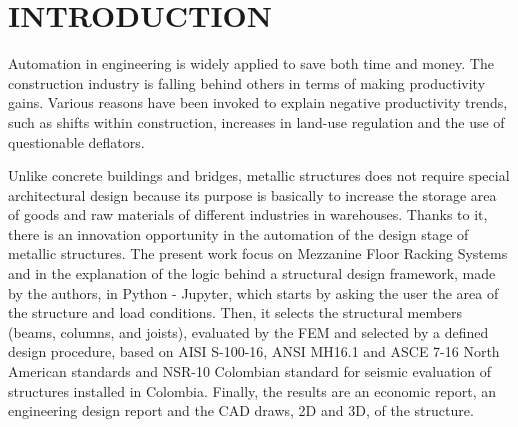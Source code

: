 \section*{INTRODUCTION}

Automation in engineering is widely applied to save both time and money. The construction industry is falling behind others in terms of making productivity gains\cite{Chen2018}. Various reasons have been invoked to explain negative productivity trends, such as shifts within construction, increases in land-use regulation and the use of questionable deflators\cite{ConsProd2016}. 

Unlike concrete buildings and bridges, metallic structures does not require special architectural design because its purpose is basically to increase the storage area of goods and raw materials of different industries in warehouses. Thanks to it, there is an innovation opportunity in the automation of the design stage of metallic structures. The present work focus on Mezzanine Floor Racking Systems and in the explanation of the logic behind a structural design framework, made by the authors, in Python - Jupyter, which starts by asking the user the area of the structure and load conditions. Then, it selects the structural members (beams, columns, and joists), evaluated by the FEM and selected by a defined design procedure, based on AISI S-100-16, ANSI MH16.1 and ASCE 7-16 North American standards and NSR-10 Colombian standard for seismic evaluation of structures installed in Colombia. Finally, the results are an economic report, an engineering design report and the CAD draws, 2D and 3D, of the structure.